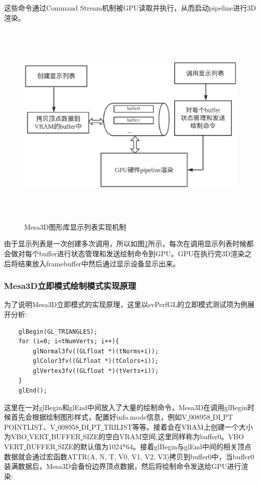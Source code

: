 这些命令通过Command Stream机制被GPU读取并执行，从而启动pipeline进行3D渲染。

\begin{figure}[H] 
  \centering
  \includegraphics[width=12cm,height=10cm]{figures/chap03/display-list-flow}
  \caption{Mesa3D图形库显示列表实现机制}
  \label{fig:display-list-flow}
\end{figure}

由于显示列表是一次创建多次调用，所以如图\ref{fig:display-list-flow}所示，每次在调用显示列表时候都会做对每个buffer进行状态管理和发送绘制命令到GPU。GPU在执行完3D渲染之后将结果放入framebuffer中然后通过显示设备显示出来。

\subsubsection{Mesa3D立即模式绘制模式实现原理}

为了说明Mesa3D立即模式的实现原理，这里以svPerfGL的立即模式测试项为例展开分析:

\begin{lstlisting}
	glBegin(GL_TRIANGLES);
	for (i=0; i<tNumVerts; i++){
		glNormal3fv((GLfloat *)(tNorms+i));
		glColor3fv((GLfloat *)(tColors+i));
	    glVertex3fv((GLfloat *)(tVerts+i));
	}
	glEnd();
\end{lstlisting}

这里在一对glBegin和glEnd中间放入了大量的绘制命令，Mesa3D在调用glBegin时候首先会根据绘制图形样式，配置好info.mode信息，例如V\underline{ }008958\underline{ }DI\underline{ }PT\underline{ }POINTLIST、V\underline{ }008958\underline{ }DI\underline{ }PT\underline{ }TRILIST等等。接着会在VRAM上创建一个大小为VBO\underline{ }VERT\underline{ }BUFFER\underline{ }SIZE的空白VRAM空间,这里同样称为buffer0。VBO\underline{ }VERT\underline{ }BUFFER\underline{ }SIZE的默认值为1024*64。接着glBegin与glEnd中间的相关顶点数据就会通过宏函数ATTR(A, N, T, V0, V1, V2, V3)拷贝到buffer0中，当buffer0装满数据后，Mesa3D会备份边界顶点数据，然后将绘制命令发送给GPU进行渲染:

